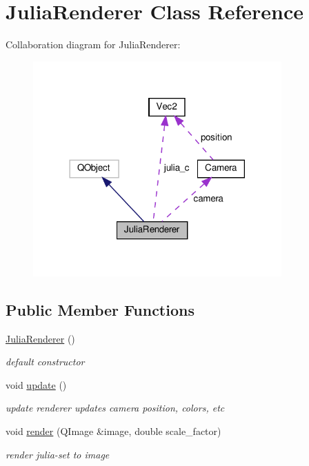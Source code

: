 \hypertarget{classJuliaRenderer}{}\section{Julia\+Renderer Class Reference}
\label{classJuliaRenderer}


Collaboration diagram for Julia\+Renderer\+:
\nopagebreak
\begin{figure}[H]
\begin{center}
\leavevmode
\includegraphics[width=270pt]{classJuliaRenderer__coll__graph}
\end{center}
\end{figure}
\subsection*{Public Member Functions}
\begin{DoxyCompactItemize}
\item 
\mbox{\label{classJuliaRenderer_a6fc0f5a07835264e53ba7dea9a6562a4}} 
\hyperlink{classJuliaRenderer_a6fc0f5a07835264e53ba7dea9a6562a4}{Julia\+Renderer} ()
\begin{DoxyCompactList}\small\item\em default constructor \end{DoxyCompactList}\item 
\mbox{\label{classJuliaRenderer_affd048fa174855e27db9453eda38d2ba}} 
void \hyperlink{classJuliaRenderer_affd048fa174855e27db9453eda38d2ba}{update} ()
\begin{DoxyCompactList}\small\item\em update renderer updates camera position, colors, etc \end{DoxyCompactList}\item 
void \hyperlink{classJuliaRenderer_a2231caba8e65e19eb3074670c96e705f}{render} (Q\+Image \&image, double scale\+\_\+factor)
\begin{DoxyCompactList}\small\item\em render julia-\/set to image \end{DoxyCompactList}\end{DoxyCompactItemize}
